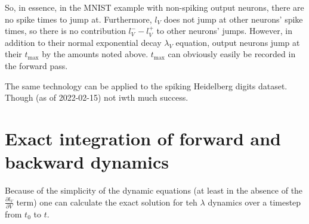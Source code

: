 \documentclass[a4paper]{article}
\begin{document}
So, in essence, in the MNIST example with non-spiking output neurons, there are no spike times to jump at. Furthermore, $l_V$ does not jump at other neurons' spike times, so there is no contribution $l_V^- - l_V^+$ to other neurons' jumps. However, in addition to their normal exponential decay $\lambda_V$ equation, output neurons jump at their $t_{\text{max}}$ by the amounts noted above. $t_{\text{max}}$ can obviously easily be recorded in the forward pass.

The same technology can be applied to the spiking Heidelberg digits dataset. Though (as of 2022-02-15) not iwth much success.

\section{Exact integration of forward and backward dynamics}
Because of the simplicity of the dynamic equations (at least in the absence of the $\frac{\partial l_V}{\partial V}$ term) one can calculate the exact solution for teh $\lambda$ dynamics over a timestep from $t_0$ to $t$.
\end{document}
